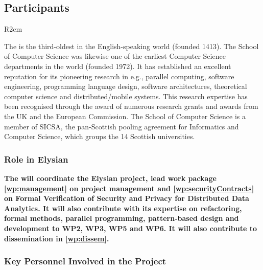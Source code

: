 \documentclass[a4paper,11pt]{article}
\newcommand{\project}[1]{\textbf{#1}\xspace}
\newcommand{\SECURITY}{\project{Elysian}}
\newcommand{\TheProject}{\SECURITY}
\begin{document}
\subsection{Participants}

\begin{wrapfigure}{R}{2cm}
\vspace{-3.95cm}
\hfill {}
\vspace{-1cm}
\end{wrapfigure}

\label{sec:participantUSTAN}

The \SAlong{} is the third-oldest in the English-speaking world (founded 1413).
The School of Computer Science was likewise one of the earliest Computer Science departments in the world (founded 1972).
It has established an excellent reputation for its pioneering research in e.g.,
parallel computing, software engineering, programming language design,
software architectures, theoretical computer science and
distributed/mobile systems.  This research expertise has been
recognised through the award of numerous research grants and
awards from the UK and the European Commission. The School of Computer Science is a member of SICSA, the pan-Scottish pooling agreement for Informatics and Computer Science, which groups the 14 Scottish universities.

\vspace{10pt}
\subsubsection*{Role in Elysian}
\textbf{The \SAlong{} will coordinate the \TheProject{} project, lead work package \ref{wp:management} on project management and \ref{wp:securityContracts} on Formal Verification of Security and Privacy for Distributed Data Analytics. It will also contribute with its expertise on refactoring, formal methods, parallel programming, pattern-based design and development to WP2, WP3, WP5 and WP6. It will also contribute to dissemination in
\ref{wp:dissem}.}


\vspace{10pt}
\subsubsection*{Key Personnel Involved in the Project}
\end{document}
